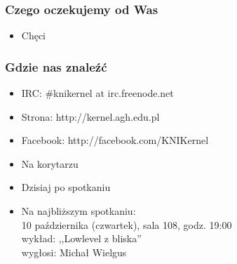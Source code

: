 \documentclass[12pt]{beamer}
\begin{document}
\begin{frame}
	\frametitle{Czego oczekujemy od Was}
	\begin{itemize}
		\item<2->Chęci
	\end{itemize}
\end{frame}
\begin{frame}
	\frametitle{Gdzie nas znaleźć}
	\begin{itemize}
		\item<2->IRC: \#knikernel at irc.freenode.net
		\item<3->Strona: http://kernel.agh.edu.pl
		\item<4->Facebook: http://facebook.com/KNIKernel
		\item<5->Na korytarzu
		\item<6->Dzisiaj po spotkaniu
		\item<7->Na najbliższym spotkaniu:\\
		10 października (czwartek), sala 108, godz. 19:00\\
		wykład: ,,Lowlevel z bliska''\\
		wygłosi: Michał Wielgus
	\end{itemize}
\end{frame}
\end{document}
